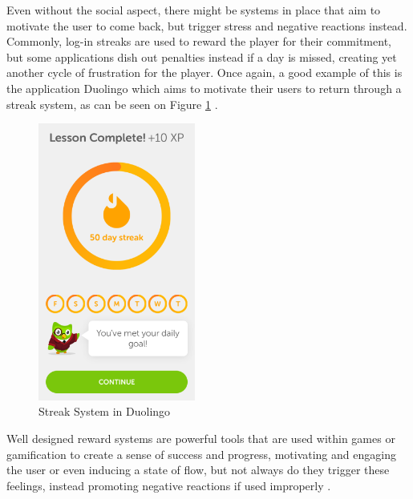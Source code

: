 Even without the social aspect, there might be systems in place that aim to motivate the user to come back, but trigger stress and negative reactions instead. Commonly, log-in streaks are used to reward the player for their commitment, but some applications dish out penalties instead if a day is missed, creating yet another cycle of frustration for the player. Once again, a good example of this is the application Duolingo which aims to motivate their users to return through a streak system, as can be seen on Figure \ref{fig:2} \cite{streak}.

\begin{figure}[h]
    \centering
    \includegraphics[width=0.46\textwidth]{figures/streak}
    \caption{Streak System in Duolingo}
    \label{fig:2}
\end{figure}

Well designed reward systems are powerful tools that are used within games or gamification to create a sense of success and progress, motivating and engaging the user or even inducing a state of flow, but not always do they trigger these feelings, instead promoting negative reactions if used improperly \cite{equilibrium}.

